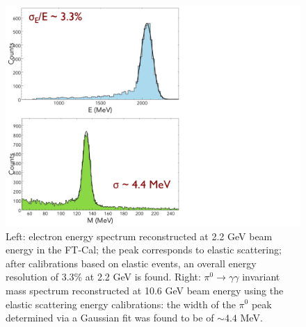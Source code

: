 \begin{figure}
\includegraphics[height=1.0\columnwidth]{fig/ftcal_elasticres.pdf}
\caption{Left: electron energy spectrum reconstructed at 2.2 GeV beam energy in the FT-Cal; the peak corresponds to elastic scattering; after calibrations based on elastic events, an overall energy resolution of 3.3\% at 2.2 GeV is found. Right: $\pi^0\to\gamma\gamma$ invariant mass spectrum reconstructed at 10.6 GeV beam energy using the elastic scattering energy calibrations: the width of the $\pi^0$ peak determined via a Gaussian fit was found to be of $\sim 4.4$ MeV.}
\label{fig:ftcal_elasticres}
\end{figure}

